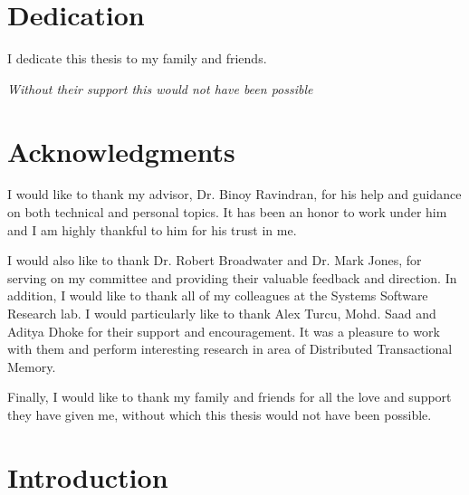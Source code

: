 \documentclass[12pt,english]{report}
\begin{document}
\pagebreak

\chapter*{Dedication}

\begin{center}
I dedicate this thesis to my family and friends.

\textit{Without their support this would not have been possible}

\end{center}


\chapter*{Acknowledgments}

I would like to thank my advisor, Dr. Binoy Ravindran, for his 
help and guidance on both technical and personal 
topics. It has been an honor to work under him and I am highly thankful
to him for his trust in me.

I would also like to thank Dr. Robert Broadwater and Dr. Mark Jones,
for serving on my committee and providing their valuable feedback
and direction. In addition, I would like to thank all of my colleagues
at the Systems Software Research lab. I would particularly like to thank
Alex Turcu, Mohd. Saad and Aditya Dhoke for their support and encouragement.
It was a pleasure to work with them and perform interesting research in area 
of Distributed Transactional Memory.

Finally, I would like to thank my family and friends for all the
love and support they have given me, without which this thesis would 
not have been possible.

\tableofcontents
\pagebreak

\listoffigures
\pagebreak


\listoftables
\pagebreak


\pagestyle{myheadings}


\chapter{Introduction}\label{chap:intro}
\end{document}
